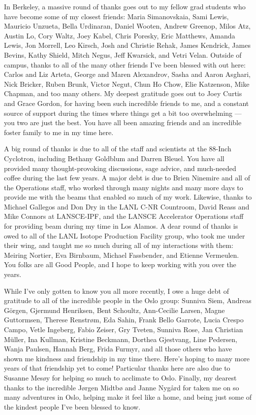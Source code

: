 \documentclass[
]{ucbthesis}
\begin{document}
\begin{frontmatter}
\begin{acknowledgements}
In Berkeley, a massive round of thanks goes out to my fellow grad students who have become some of my closest friends:   Maria Simanovskaia, Sami Lewis, Mauricio Unzueta, Bella Urdinaran, Daniel Wooten, Andrew Greenop,  Milos Atz, Austin Lo, Cory Waltz, Joey Kabel, Chris Poresky, Eric Matthews, Amanda Lewis, Jon Morrell, Leo Kirsch, Josh and Christie Rehak, James Kendrick, James Bevins, Kathy Shield, Mitch Negus, Jeff Kwarsick, and Vetri Velan.
Outside of campus, thanks to all of the many other friends I've been blessed with out here: Carlos and Liz Arteta, George and Maren Alexandrov, Sasha and Aaron Asghari,  Nick Bricker, Ruben Brunk, Victor Negut, Chun Ho Chow, Elie Katzenson, Mike Chapman, and too many others.
My deepest gratitude goes out to Joey Curtis and Grace Gordon, for having been such incredible friends to me, and a constant source of support during the times where things get a bit too overwhelming --- you two are just the best. 
You have all been amazing friends and an incredible foster family to me in my time here. 


A big round of thanks is due to all of the staff and scientists at the 88-Inch Cyclotron, including Bethany Goldblum and Darren Bleuel.
You have all provided many thought-provoking discussions, sage advice, and much-needed coffee during the last few years.
A major debt is due to Brien Ninemire   and all of the Operations staff, who worked through many nights and many more days to provide me with the beams that enabled so much of my work.
Likewise, thanks to Michael Gallegos and Don Dry in the LANL C-NR Countroom, David Reass and Mike Connors at LANSCE-IPF, and the LANSCE Accelerator Operations staff for providing beam during my time in Los Alamos.
A dear round of thanks is owed to all of the LANL Isotope Production Facility group, who took me under their wing, and taught me so much during all of my interactions with them: Meiring Nortier, Eva Birnbaum, Michael Fassbender, and  Etienne Vermeulen.
You folks are all Good People, and I hope to keep working with you over the years.



While I've only gotten to know you all more recently, I owe a huge debt of gratitude to all of the incredible people in the Oslo group: Sunniva Siem, Andreas G{\"o}rgen, Gjermund Henriksen, Bent  Schoultz, Ann-Cecilie Larsen, Magne Guttormsen, Therese Renstr{\o}m, Eda Sahin, Frank Bello Garrote, Lucia Crespo Campo, Vetle Ingeberg, Fabio Zeiser, Gry Tveten, Sunniva Rose, Jan Christian M{\"u}ller, Ina Kullman, Kristine Beckmann, Dorthea Gjestvang, Line Pedersen, Wanja Paulsen, Hannah Berg,  Frida Furmyr, and all those others who have shown me kindness and friendship in my time there.
Here's hoping to many more years of that friendship yet to come!
Particular thanks here are also due to Susanne Mes{\o}y for helping so much to acclimate to Oslo.
Finally, my dearest thanks to  the incredible J{\o}rgen Midtb{\o} and Janne Nyg{\aa}rd for taken me on so many adventures in Oslo, helping make it feel like a home, and being just some of the kindest people I've been blessed to know. 




\end{acknowledgements}
\end{frontmatter}
\end{document}
